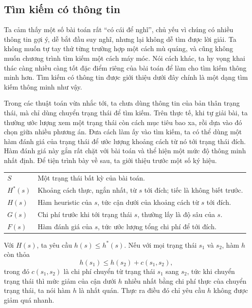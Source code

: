 \documentclass[11pt]{article}
\begin{document}
\subsection{Tìm kiếm có thông tin}

Ta cảm thấy một số bài toán rất ``có cái để nghĩ'', chủ yếu vì chúng có nhiều
thông tin gợi ý, dễ bắt đầu suy nghĩ, nhưng lại không dễ tìm được lời giải.
Ta không muốn tự tay thử từng trường hợp một cách mù quáng, và cũng không
muốn chương trình tìm kiếm một cách máy móc. Nói cách khác, ta hy vọng khai
thác càng nhiều càng tốt đặc điểm riêng của bài toán để làm cho tìm kiếm
thông minh hơn. Tìm kiếm có thông tin được giới thiệu dưới đây chính là một
dạng tìm kiếm thông minh như vậy.

Trong các thuật toán vừa nhắc tới, ta chưa dùng thông tin của bản thân trạng
thái, mà chỉ dùng chuyển trạng thái để tìm kiếm. Trên thực tế, khi tự giải
bài, ta thường ước lượng xem một trạng thái còn cách mục tiêu bao xa, rồi
dựa vào đó chọn giữa nhiều phương án. Đưa cách làm ấy vào tìm kiếm, ta có
thể dùng một hàm đánh giá của trạng thái để ước lượng khoảng cách từ nó tới
trạng thái đích. Hàm đánh giá này gắn rất chặt với bài toán và thể hiện một
mức độ thông minh nhất định. Để tiện trình bày về sau, ta giới thiệu trước
một số ký hiệu.

\begin{center}
\begin{tabular}{ll}
\(S\) & Một trạng thái bất kỳ của bài toán.\\
\(H^*(s)\) & Khoảng cách thực, ngắn nhất, từ \(s\) tới đích; tiếc là không biết trước.\\
\(H(s)\) & Hàm heuristic của \(s\), tức cận dưới của khoảng cách từ \(s\) tới đích.\\
\(G(s)\) & Chi phí trước khi tới trạng thái \(s\), thường lấy là độ sâu của \(s\).\\
\(F(s)\) & Hàm đánh giá của \(s\), tức ước lượng tổng chi phí để tới đích.\\
\end{tabular}
\end{center}

Với \(H(s)\), ta yêu cầu \(h(s)\le h^*(s)\). Nếu với mọi trạng thái \(s_1\) và
\(s_2\), hàm \(h\) còn thỏa
\[
  h(s_1)\le h(s_2)+c(s_1,s_2),
\]
trong đó \(c(s_1,s_2)\) là chi phí chuyển từ trạng thái \(s_1\) sang \(s_2\),
tức khi chuyển trạng thái thì mức giảm của cận dưới \(h\) nhiều nhất bằng
chi phí thực của chuyển trạng thái, ta nói hàm \(h\) là nhất quán. Thực ra
điều đó chỉ yêu cầu \(h\) không được giảm quá nhanh.
\end{document}

